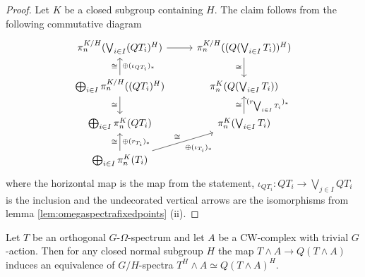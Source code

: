 \begin{proof}
Let $K$ be a closed subgroup containing $H$. The claim follows from the
following commutative diagram
$$
\begin{tikzcd}
\pi_n^{K/H}(\bigvee_{i\in I}(QT_i)^H) \arrow{r} 
&\pi_n^{K/H}((Q(\bigvee_{i \in I } T_i))^H) \arrow{d}[swap]{\cong} \\
\bigoplus_{i\in I} \pi_n^{K/H}((QT_i)^H) 
\arrow{u}{\cong}[swap]{\oplus (\iota_{QT_i})_\ast} 
\arrow{d}[swap]{\cong}
&\pi_n^K(Q(\bigvee_{i \in I } T_i))\\
\bigoplus_{i\in I} \pi_n^{K}(QT_i)
& \pi_n^K(\bigvee_{i \in I } T_i) \arrow{u}{\cong}[swap]{(r_{\bigvee_{i \in I } T_i})_\ast}\\
\bigoplus_{i\in I} \pi_n^{K}(T_i) \arrow{u}{\cong}[swap]{\oplus (r_{T_i})_\ast}  
\arrow{ru}{\cong}[swap]{\oplus (\iota_{T_i})_\ast} 
\end{tikzcd}
$$
where the horizontal map is the map from the statement, $\iota_{QT_i}:QT_i
\rightarrow \bigvee_{j\in I} QT_i$ is the inclusion and the undecorated vertical arrows 
are the isomorphisms from lemma \ref{lem:omegaspectrafixedpoints} (ii).
\end{proof}

\begin{lem}\label{lem:smashfixed}
Let $T$ be an orthogonal $G$-$\Omega$-spectrum and let $A$ be a CW-complex with trivial $G$-action.
Then for any closed normal subgroup $H$ the map 
$ T\wedge A\to Q(T\wedge A)
$
induces an equivalence of $G/H$-spectra $T^H\wedge A\simeq Q(T\wedge A)^H$.
\end{lem}

